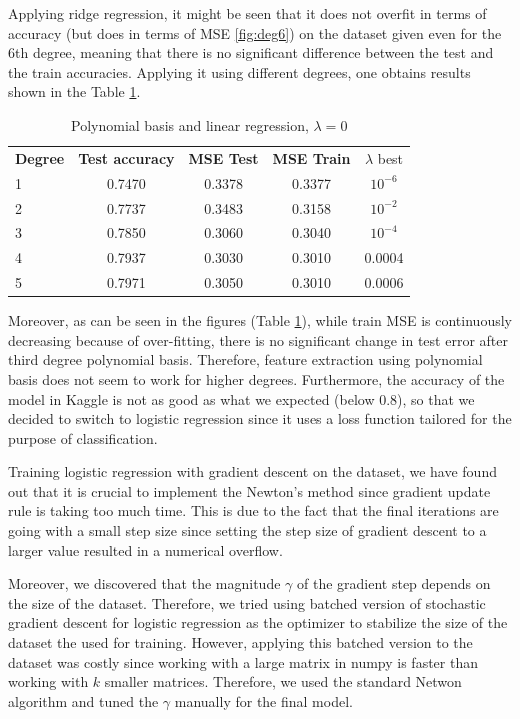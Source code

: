 \documentclass[10pt,conference,compsocconf]{IEEEtran}
\begin{document}
Applying ridge regression, it might be seen that it does not overfit in terms of accuracy (but does in terms of MSE \ref{fig:deg6}) on the dataset given even for the 6th degree, meaning that there is no significant difference between the test and the train accuracies. Applying it using different degrees, one obtains results shown in the Table \ref{tab:degrees}.

\begin{table}[!htb]
	\caption{Polynomial basis and linear regression, $\lambda=0$}	\label{tab:degrees}
	\centering\begin{tabular}{|lcccc|}\hline
		{\bf Degree} & {\bf Test accuracy} & {\bf MSE Test} & {\bf MSE Train} & {$\lambda$ best}\\
		1 & 0.7470 & 0.3378 & 0.3377 & $10^{-6}$\\
		2 & 0.7737 & 0.3483 & 0.3158 & $10^{-2}$\\		
		3 & 0.7850 & 0.3060 & 0.3040 & $10^{-4}$\\
		4 & 0.7937 & 0.3030 & 0.3010 & 0.0004\\
		5 & 0.7971 & 0.3050 & 0.3010 & 0.0006\\\hline
	\end{tabular}
\end{table}

Moreover, as can be seen in the figures (Table \ref{tab:degrees}), while train MSE is continuously decreasing because of over-fitting, there is no significant change in test error after third degree polynomial basis. Therefore, feature extraction using polynomial basis does not seem to work for higher degrees. Furthermore, the accuracy of the model in Kaggle is not as good as what we expected (below 0.8), so that we decided to switch to logistic regression since it uses a loss function tailored for the purpose of classification.

Training logistic regression with gradient descent on the dataset, we have found out that it is crucial to implement the Newton's method since gradient update rule is taking too much time. This is due to the fact that the final iterations are going with a small step size since setting the step size of gradient descent to a larger value resulted in a numerical overflow.

Moreover, we discovered that the magnitude $\gamma$ of the gradient step depends on the size of the dataset. Therefore, we tried using batched version of stochastic gradient descent for logistic regression as the optimizer to stabilize the size of the dataset the used for training. However, applying this batched version to the dataset was costly since working with a large matrix in numpy is faster than working with $k$ smaller matrices. Therefore, we used the standard Netwon algorithm and tuned the $\gamma$ manually for the final model.
\end{document}
